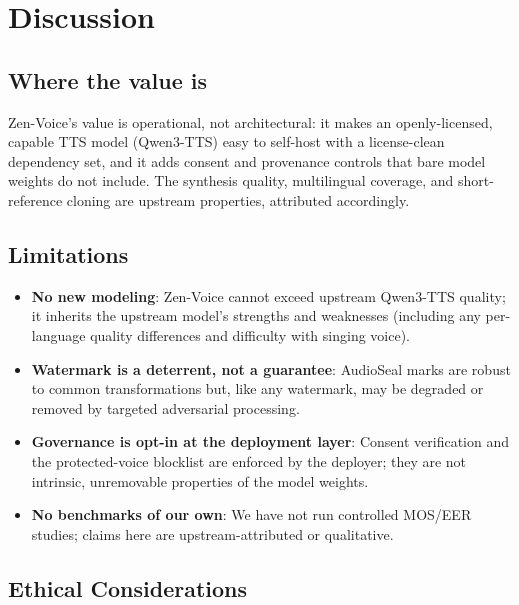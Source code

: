 \documentclass[11pt,a4paper]{article}
\begin{document}
\section{Discussion}
\label{sec:discussion}

\subsection{Where the value is}

Zen-Voice's value is operational, not architectural: it makes an openly-licensed,
capable TTS model (Qwen3-TTS) easy to self-host with a license-clean dependency set,
and it adds consent and provenance controls that bare model weights do not include.
The synthesis quality, multilingual coverage, and short-reference cloning are upstream
properties, attributed accordingly.

\subsection{Limitations}

\begin{itemize}
    \item \textbf{No new modeling}: Zen-Voice cannot exceed upstream Qwen3-TTS quality;
          it inherits the upstream model's strengths and weaknesses (including any
          per-language quality differences and difficulty with singing voice).
    \item \textbf{Watermark is a deterrent, not a guarantee}: AudioSeal marks are
          robust to common transformations but, like any watermark, may be degraded or
          removed by targeted adversarial processing.
    \item \textbf{Governance is opt-in at the deployment layer}: Consent verification
          and the protected-voice blocklist are enforced by the deployer; they are not
          intrinsic, unremovable properties of the model weights.
    \item \textbf{No benchmarks of our own}: We have not run controlled MOS/EER studies;
          claims here are upstream-attributed or qualitative.
\end{itemize}

\subsection{Ethical Considerations}
\end{document}
